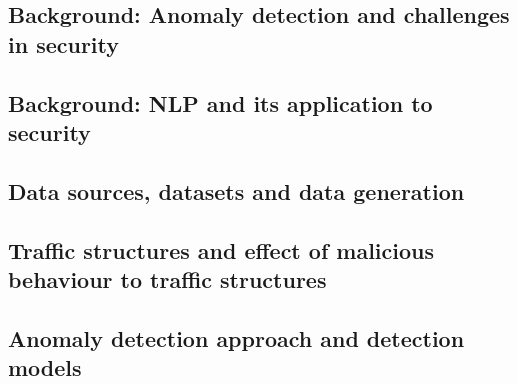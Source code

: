 \documentclass[a4paper,12pt,twoside]{article}
\begin{document}
\subsection{Background: Anomaly detection and challenges in security}

\subsection{Background: NLP and its application to security}

\subsection{Data sources, datasets and data generation}


\subsection{Traffic structures and effect of malicious behaviour to traffic structures}

\subsection{Anomaly detection approach and detection models}





\end{document}
